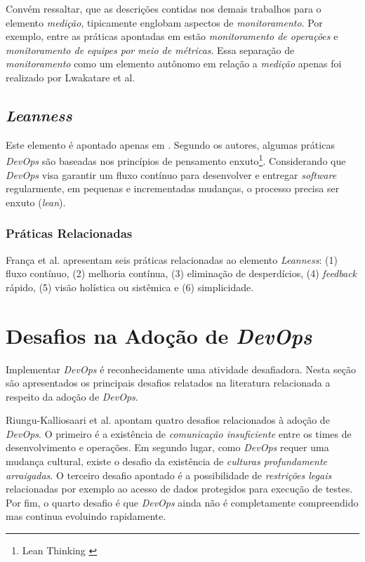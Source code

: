 Convém ressaltar, que as descrições contidas nos demais trabalhos para o
elemento \emph{medição}, tipicamente englobam aspectos de \emph{monitoramento}.
Por exemplo, entre as práticas apontadas em \cite{characterizing_devops} estão
\emph{monitoramento de operações} e \emph{monitoramento de equipes por meio de
métricas}. Essa separação de \emph{monitoramento} como um elemento autônomo em
relação a \emph{medição} apenas foi realizado por Lwakatare et al.

\subsection{\textit{Leanness}}

Este elemento é apontado apenas em \cite{characterizing_devops}. Segundo os
autores, algumas práticas \textit{DevOps} são baseadas nos princípios de
pensamento enxuto\footnote{Lean Thinking \cite{lean_thinking}}. Considerando
que \textit{DevOps} visa garantir um fluxo contínuo para desenvolver e entregar
\textit{software} regularmente, em pequenas e incrementadas mudanças, o processo
precisa ser enxuto (\textit{lean}).

\subsubsection{Práticas Relacionadas}
França et al. \cite{characterizing_devops} apresentam seis práticas
relacionadas ao elemento \textit{Leanness}: (1) fluxo contínuo, (2) melhoria
contínua, (3) eliminação de desperdícios, (4) \textit{feedback} rápido, (5)
visão holística ou sistêmica e (6) simplicidade.

\section{Desafios na Adoção de \textit{DevOps}}

Implementar \textit{DevOps} é reconhecidamente uma atividade desafiadora. Nesta
seção são apresentados os principais desafios relatados na literatura
relacionada a respeito da adoção de \textit{DevOps}.

Riungu-Kalliosaari et al. \cite{devops_benefits_challenges} apontam quatro
desafios relacionados à adoção de \textit{DevOps}. O primeiro é a existência
de \emph{comunicação insuficiente} entre os times de desenvolvimento e
operações. Em segundo lugar, como \textit{DevOps} requer
uma mudança cultural, existe o desafio da existência de \emph{culturas
profundamente arraigadas}. O terceiro desafio apontado é a possibilidade de
\emph{restrições legais} relacionadas por exemplo ao acesso de dados protegidos
para execução de testes. Por fim, o quarto desafio é que \textit{DevOps}
ainda não é completamente compreendido mas continua evoluindo rapidamente.


